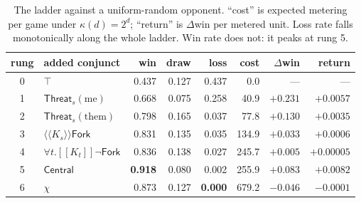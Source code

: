 \documentclass[11pt]{article}
\theoremstyle{definition}
\theoremstyle{plain}
\theoremstyle{remark}
\newcommand{\Thr}{\mathsf{Threat}}
\newcommand{\Frk}{\mathsf{Fork}}
\newcommand{\Ctr}{\mathsf{Central}}
\begin{document}
\begin{table}[h]
\centering
\begin{tabular}{@{}clrrrrrr@{}}
\toprule
rung & added conjunct & win & draw & loss & cost & $\Delta$win & return \\
\midrule
0 & $\top$                                  & 0.437 & 0.127 & 0.437 & 0.0 & --- & --- \\
1 & $\Thr_s(\text{me})$                     & 0.668 & 0.075 & 0.258 & 40.9 & $+0.231$ & $+0.0057$ \\
2 & $\Thr_s(\text{them})$                   & 0.798 & 0.165 & 0.037 & 77.8 & $+0.130$ & $+0.0035$ \\
3 & $\langle\!\langle K_s\rangle\!\rangle\Frk$ & 0.831 & 0.135 & 0.035 & 134.9 & $+0.033$ & $+0.0006$ \\
4 & $\forall t.[\![K_t]\!]\neg\Frk$         & 0.836 & 0.138 & 0.027 & 245.7 & $+0.005$ & $+0.00005$ \\
5 & $\Ctr$                                  & \textbf{0.918} & 0.080 & 0.002 & 255.9 & $+0.083$ & $\mathbf{+0.0082}$ \\
6 & $\chi$                                  & 0.873 & 0.127 & \textbf{0.000} & 679.2 & $-0.046$ & $-0.0001$ \\
\bottomrule
\end{tabular}
\caption{The ladder against a uniform-random opponent. ``cost'' is expected
metering per game under $\kappa(d)=2^d$; ``return'' is $\Delta$win per metered
unit. Loss rate falls monotonically along the whole ladder. Win rate does not:
it peaks at rung 5.}
\label{tab:ladder}
\end{table}
\end{document}
